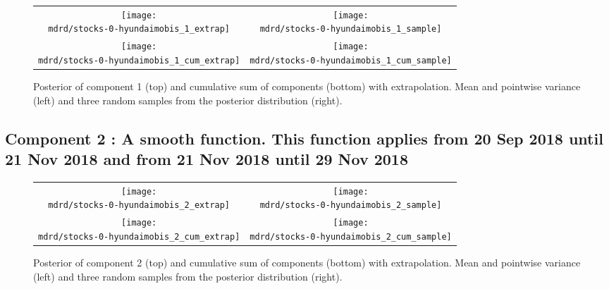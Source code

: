 \documentclass{article} %
\begin{document}


\begin{figure}[H]
\newcommand{\wmgd}{0.5\columnwidth}
\newcommand{\hmgd}{3.0cm}
\newcommand{\mdrd}{stocks-0-hyundaimobis}
\newcommand{\mbm}{\hspace{-0.3cm}}
\begin{tabular}{cc}
\mbm \texttt{[image: \\mdrd/stocks-0-hyundaimobis\_1\_extrap]} & \texttt{[image: \\mdrd/stocks-0-hyundaimobis\_1\_sample]} \\
\mbm \texttt{[image: \\mdrd/stocks-0-hyundaimobis\_1\_cum\_extrap]} & \texttt{[image: \\mdrd/stocks-0-hyundaimobis\_1\_cum\_sample]}
\end{tabular}
\caption{Posterior of component 1 (top) and cumulative sum of components (bottom) with extrapolation. Mean and pointwise variance (left) and three random samples from the posterior distribution (right).}
\label{fig:extrap1}
\end{figure}

\subsection{Component 2 : A smooth function. This function applies from 20 Sep 2018 until 21 Nov 2018 and from 21 Nov 2018 until 29 Nov 2018}



\begin{figure}[H]
\newcommand{\wmgd}{0.5\columnwidth}
\newcommand{\hmgd}{3.0cm}
\newcommand{\mdrd}{stocks-0-hyundaimobis}
\newcommand{\mbm}{\hspace{-0.3cm}}
\begin{tabular}{cc}
\mbm \texttt{[image: \\mdrd/stocks-0-hyundaimobis\_2\_extrap]} & \texttt{[image: \\mdrd/stocks-0-hyundaimobis\_2\_sample]} \\
\mbm \texttt{[image: \\mdrd/stocks-0-hyundaimobis\_2\_cum\_extrap]} & \texttt{[image: \\mdrd/stocks-0-hyundaimobis\_2\_cum\_sample]}
\end{tabular}
\caption{Posterior of component 2 (top) and cumulative sum of components (bottom) with extrapolation. Mean and pointwise variance (left) and three random samples from the posterior distribution (right).}
\label{fig:extrap2}
\end{figure}
\end{document}
